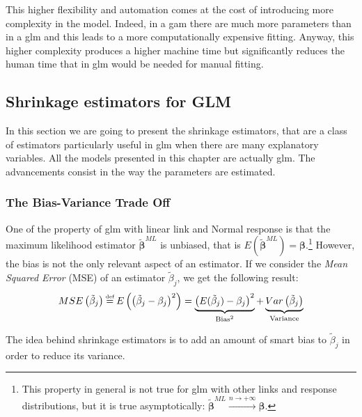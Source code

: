 \documentclass[a4paper, twoside, openright, 12pt]{report}
\newcommand\eqdef{\mathrel{\overset{\makebox[0pt]{\mbox{\normalfont\tiny def}}}{=}}}
\theoremstyle{definition}
\theoremstyle{definition}
\theoremstyle{definition}
\theoremstyle{remark}
\begin{document}
This higher flexibility and automation comes at the cost of introducing more complexity in the model. Indeed, in a \ac{gam} there are much more parameters than in a \ac{glm} and this leads to a more computationally expensive fitting. Anyway, this higher complexity produces a higher machine time but significantly reduces the human time that in \ac{glm} would be needed for manual fitting.

\newpage

\hypertarget{chap:shrinkage-estimators}{%
\subsection{Shrinkage estimators for GLM}\label{chap:shrinkage-estimators}}

In this section we are going to present the shrinkage estimators, that are a class of estimators particularly useful in \ac{glm} when there are many explanatory variables. All the models presented in this chapter are actually \ac{glm}. The advancements consist in the way the parameters are estimated.

\hypertarget{the-bias-variance-trade-off}{%
\subsubsection{The Bias-Variance Trade Off}\label{the-bias-variance-trade-off}}

One of the property of \ac{glm} with linear link and Normal response is that the maximum likelihood estimator \(\boldsymbol{\tilde{\beta}}^{ML}\) is unbiased, that is \(E\left(\boldsymbol{\tilde{\beta}}^{ML}\right) = \boldsymbol{\beta}\).\footnote{This property in general is not true for \ac{glm} with other links and response distributions, but it is true asymptotically: \(\boldsymbol{\tilde{\beta}}^{ML} \xrightarrow{n\to+\infty} \boldsymbol{\beta}\).} However, the bias is not the only relevant aspect of an estimator. If we consider the \emph{Mean Squared Error} (MSE) of an estimator \(\tilde{\beta}_j\), we get the following result:
\begin{equation}
\label{eq:bias-variance}
MSE\left(\tilde{\beta}_j\right) \eqdef E\left(\left(\tilde{\beta}_j - \beta_j\right)^2\right) =
\underbrace{\left( E(\tilde{\beta}_j)-\beta_j \right)^2}_{\text{Bias}^2} + 
\underbrace{Var\left( \tilde{\beta}_j \right)}_{\text{Variance}}
\end{equation}

The idea behind shrinkage estimators is to add an amount of smart bias to \(\tilde{\beta}_j\) in order to reduce its variance.
\end{document}

